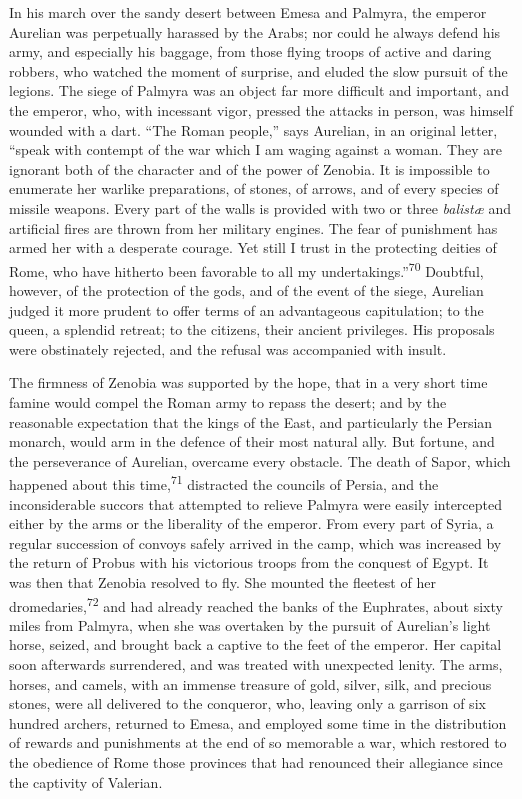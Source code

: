 In his march over the sandy desert between Emesa and Palmyra, the
emperor Aurelian was perpetually harassed by the Arabs; nor could
he always defend his army, and especially his baggage, from those
flying troops of active and daring robbers, who watched the
moment of surprise, and eluded the slow pursuit of the legions.
The siege of Palmyra was an object far more difficult and
important, and the emperor, who, with incessant vigor, pressed
the attacks in person, was himself wounded with a dart. “The
Roman people,” says Aurelian, in an original letter, “speak with
contempt of the war which I am waging against a woman. They are
ignorant both of the character and of the power of Zenobia. It is
impossible to enumerate her warlike preparations, of stones, of
arrows, and of every species of missile weapons. Every part of
the walls is provided with two or three \textit{balistæ} and artificial
fires are thrown from her military engines. The fear of
punishment has armed her with a desperate courage. Yet still I
trust in the protecting deities of Rome, who have hitherto been
favorable to all my undertakings.”\textsuperscript{70} Doubtful, however, of the
protection of the gods, and of the event of the siege, Aurelian
judged it more prudent to offer terms of an advantageous
capitulation; to the queen, a splendid retreat; to the citizens,
their ancient privileges. His proposals were obstinately
rejected, and the refusal was accompanied with insult.


The firmness of Zenobia was supported by the hope, that in a very
short time famine would compel the Roman army to repass the
desert; and by the reasonable expectation that the kings of the
East, and particularly the Persian monarch, would arm in the
defence of their most natural ally. But fortune, and the
perseverance of Aurelian, overcame every obstacle. The death of
Sapor, which happened about this time,\textsuperscript{71} distracted the councils
of Persia, and the inconsiderable succors that attempted to
relieve Palmyra were easily intercepted either by the arms or the
liberality of the emperor. From every part of Syria, a regular
succession of convoys safely arrived in the camp, which was
increased by the return of Probus with his victorious troops from
the conquest of Egypt. It was then that Zenobia resolved to fly.
She mounted the fleetest of her dromedaries,\textsuperscript{72} and had already
reached the banks of the Euphrates, about sixty miles from
Palmyra, when she was overtaken by the pursuit of Aurelian’s
light horse, seized, and brought back a captive to the feet of
the emperor. Her capital soon afterwards surrendered, and was
treated with unexpected lenity. The arms, horses, and camels,
with an immense treasure of gold, silver, silk, and precious
stones, were all delivered to the conqueror, who, leaving only a
garrison of six hundred archers, returned to Emesa, and employed
some time in the distribution of rewards and punishments at the
end of so memorable a war, which restored to the obedience of
Rome those provinces that had renounced their allegiance since
the captivity of Valerian.

